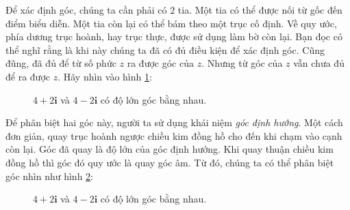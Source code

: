 \documentclass[a4paper, titlepage, openany]{book}
\numberwithin{equation}{chapter}
\begin{document}
Để xác định góc, chúng ta cần phải có $2$ tia. Một tia có thể được nối từ gốc đến điểm biểu diễn. Một tia còn lại có thể bám theo một trục cố định. Về quy ước, phía dương trục hoành, hay trục thực, được sử dụng làm bờ còn lại. Bạn đọc có thể nghĩ rằng là khi này chúng ta đã có đủ điều kiện để xác định góc. Cũng đũng, đã đủ để từ số phức $z$ ra được góc của $z$. Nhưng từ góc của $z$ vẫn chưa đủ để ra được $z$. Hãy nhìn vào hình \ref{fig:hai_truong_hop_goc}:
\begin{figure}[h]
   \centering
   \caption{$4+2\mathbf{i}$ và $4-2\mathbf{i}$ có độ lớn góc bằng nhau.}
   \label{fig:hai_truong_hop_goc}
\end{figure}


Để phân biệt hai góc này, người ta sử dụng khái niệm \emph{góc định hướng}. Một cách đơn giản, quay trục hoành ngược chiều kim đồng hồ cho đến khi chạm vào cạnh còn lại. Góc đã quay là độ lớn của góc định hướng. Khi quay thuận chiều kim đồng hồ thì góc đó quy ước là quay góc âm. Từ đó, chúng ta có thể phân biệt góc nhìn như hình \ref{fig:hai_truong_hop_goc_dinh_huong}:

\begin{figure}[h]
   \centering
   \caption{$4+2\mathbf{i}$ và $4-2\mathbf{i}$ có độ lớn góc bằng nhau.}
   \label{fig:hai_truong_hop_goc_dinh_huong}
\end{figure}
\end{document}
